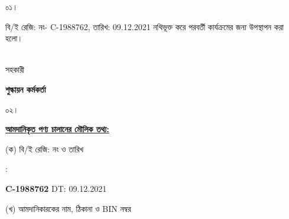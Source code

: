 \documentclass[12pt]{article}
\newcommand{\beno}{C-1988762}
\newcommand{\bedt}{09.12.2021}
\begin{document}
\noindent
\begin{minipage}[t]{0.05\linewidth}
০১।
\end{minipage}
\begin{minipage}[t]{0.95\linewidth}
বি/ই রেজি: নং- {\beno}, তারিখ: {\bedt}
নথিভূক্ত করে
পরবর্তী কার্যক্রমের জন্য উপস্থাপন করা হলো।
\\
\\
\end{minipage}
\begin{minipage}[t]{0.05\linewidth}
\hspace*{0em}
\end{minipage}
\begin{minipage}[t]{0.05\linewidth}
সহকারী
\end{minipage}
\begin{minipage}[t]{0.37\linewidth}
\hspace{0em}
\end{minipage}
\begin{minipage}[t]{0.53\linewidth}
\textbf{শুল্কায়ন কর্মকর্তা}
\\
\end{minipage}
\begin{minipage}[t]{0.05\linewidth}
০২।
\end{minipage}
\begin{minipage}[t]{0.95\linewidth}
\underline{\textbf {আমদানিকৃত পণ্য চালানের
মৌলিক তথ্য:}}
\\
\end{minipage}
\footnotesize
\begin{minipage}[t]{0.05\linewidth}
\hspace*{1em}
\end{minipage}
\begin{minipage}[t]{0.40\linewidth}
(ক) বি/ই রেজি: নং ও তারিখ
\end{minipage}
\begin{minipage}[t]{0.02\linewidth}
:
\end{minipage}
\begin{minipage}[t]{0.53\linewidth}
\textbf{{\beno}} \hspace{2em} DT: {\bedt}
\\
\end{minipage}
\begin{minipage}[t]{0.05\linewidth}
\hspace*{1em}
\end{minipage}
\begin{minipage}[t]{0.40\linewidth}
(খ) আমদানিকারকের নাম, ঠিকানা
ও BIN নম্বর
\end{minipage}
\end{document}
